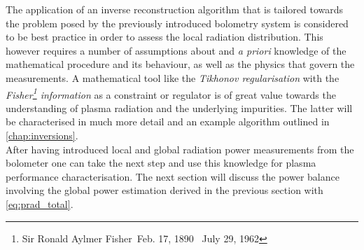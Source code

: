                 The application of an inverse reconstruction algorithm that is tailored towards the problem posed by the previously introduced bolometry system is considered to be best practice in order to assess the local radiation distribution. This however requires a number of assumptions about and \textit{a priori} knowledge of the mathematical procedure and its behaviour, as well as the physics that govern the measurements. A mathematical tool like the \textit{Tikhonov regularisation} with the \textit{Fisher\footnote[1]{Sir Ronald Aylmer Fisher~Feb. 17, 1890 \textdagger~July 29, 1962} information} as a constraint or regulator is of great value towards the understanding of plasma radiation and the underlying impurities. The latter will be characterised in much more detail and an example algorithm outlined in \cref{chap:inversions}.\\%
                \newline%
                After having introduced local and global radiation power measurements from the bolometer one can take the next step and use this knowledge for plasma performance characterisation. The next section will discuss the power balance involving the global power estimation derived in the previous section with \cref{eq:prad_total}.%
%
